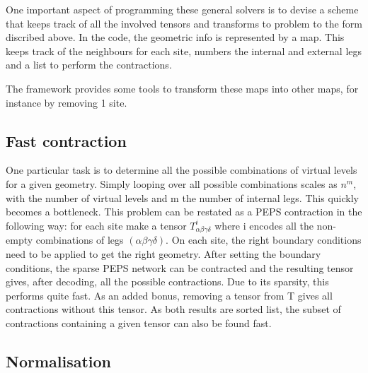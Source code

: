 One important aspect of programming these general solvers is to devise a scheme that keeps track of all the involved tensors and transforms to problem to the form discribed above. In the code, the geometric info is represented by a map. This keeps track of the neighbours for each site, numbers the internal and external legs and a list to perform the contractions.

The framework provides some tools to transform these maps into other maps, for instance by removing 1 site.

\subsection{Fast contraction}

One particular task is to determine all the possible combinations of virtual levels for a given geometry. Simply looping over all possible combinations scales as $n^m$, with the number of virtual levels and m the number of internal legs. This quickly becomes a bottleneck.
This problem can be restated as a PEPS contraction in the following way: for each site make a tensor $ T^{i}_{  \alpha \beta \gamma \delta } $ where i encodes all the non-empty combinations of legs $(\alpha \beta \gamma \delta)$. On each site, the right boundary conditions need to be applied to get the right geometry. After setting the boundary conditions, the sparse PEPS network can be contracted and the resulting tensor gives, after decoding, all the possible contractions. Due to its sparsity, this performs quite fast.
As an added bonus, removing a tensor from T gives all contractions without this tensor. As both results are sorted list, the subset of contractions containing a given tensor can also be found fast.

\subsection{Normalisation}\label{subsec:nf}

